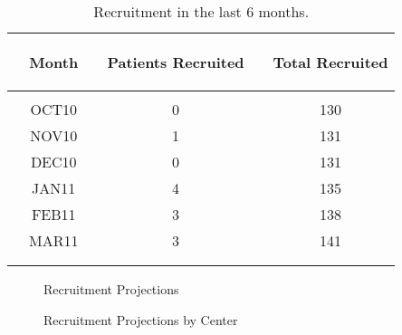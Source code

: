 \documentclass[dvips, 10pt]{article}
\begin{document}
\begin{table}[t]
\caption
{ Recruitment in the last 6 months. }
\begin{center}
\begin{tabular}{ @{}l@{}
@{}c@{}@{}p{1.5em}@{}@{}c@{}@{}p{1.5em}@{}@{}c@{}
}
\hline

& \parbox{6em}{\begin{center}Month\end{center}} && \parbox{6em}{\begin{center}Patients Recruited\end{center}} && \parbox{6em}{\begin{center}Total Recruited\end{center}} \\

\hline

\\
& OCT10 && 0 && 130 \\
& NOV10 && 1 && 131 \\
& DEC10 && 0 && 131 \\
& JAN11 && 4 && 135 \\
& FEB11 && 3 && 138 \\
& MAR11 && 3 && 141 \\
\\
\hline \\

\end{tabular}

\end{center}
 \end{table}

\begin{figure}
\caption{Recruitment Projections}
\end{figure}

\begin{figure}
\caption{Recruitment Projections by Center}
\end{figure}
\clearpage
\end{document}
